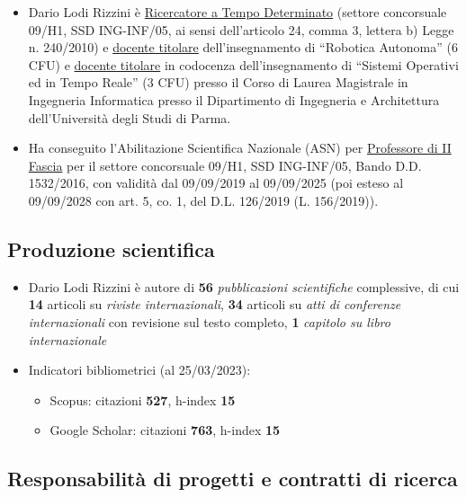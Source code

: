\documentclass[11pt]{article}
\begin{document}
\begin{itemize}
\item Dario Lodi Rizzini \`e \ul{Ricercatore a Tempo Determinato} (settore concorsuale 09/H1, SSD ING-INF/05, ai sensi dell'articolo 24, comma 3, lettera b) Legge  n. 240/2010) 
e \ul{docente titolare} dell'insegnamento di ``Robotica Autonoma'' (6 CFU) e \ul{docente titolare} in codocenza dell'insegnamento di ``Sistemi Operativi ed in Tempo Reale'' (3 CFU) presso il Corso di Laurea Magistrale in Ingegneria Informatica 
presso il Dipartimento di Ingegneria e Architettura dell'Universit\`a degli Studi di Parma. 

\item Ha conseguito l'Abilitazione Scientifica Nazionale (ASN) per \ul{Professore di II Fascia} per il settore concorsuale 09/H1, SSD ING-INF/05, Bando D.D. 1532/2016, con validit\`a dal 09/09/2019 al 09/09/2025 (poi esteso al 09/09/2028 con art. 5, co. 1, del D.L. 126/2019 (L. 156/2019)).
\end{itemize}


\subsection*{Produzione scientifica}

\begin{itemize}
\item Dario Lodi Rizzini \`e autore di \textbf{56} \emph{pubblicazioni scientifiche} complessive, di cui 
  \textbf{14} articoli su \emph{riviste internazionali}, 
  \textbf{34} articoli su \emph{atti di conferenze internazionali} con revisione sul testo completo,
  \textbf{1} \emph{capitolo su libro internazionale}

\item Indicatori bibliometrici (al 25/03/2023): 
  \begin{itemize}
  \item Scopus: citazioni \textbf{527}, h-index \textbf{15}
  \item Google Scholar: citazioni \textbf{763}, h-index \textbf{15}
  \end{itemize}
\end{itemize}


\subsection*{Responsabilit\`a di progetti e contratti di ricerca}
\end{document}
